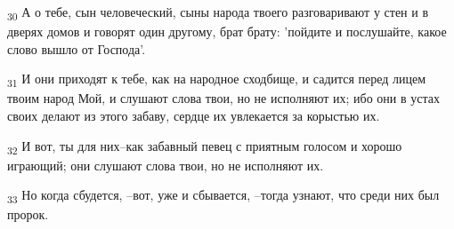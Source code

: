 \begin{tcolorbox}
\textsubscript{30} А о тебе, сын человеческий, сыны народа твоего разговаривают у стен и в дверях домов и говорят один другому, брат брату: 'пойдите и послушайте, какое слово вышло от Господа'.
\end{tcolorbox}
\begin{tcolorbox}
\textsubscript{31} И они приходят к тебе, как на народное сходбище, и садится перед лицем твоим народ Мой, и слушают слова твои, но не исполняют их; ибо они в устах своих делают из этого забаву, сердце их увлекается за корыстью их.
\end{tcolorbox}
\begin{tcolorbox}
\textsubscript{32} И вот, ты для них--как забавный певец с приятным голосом и хорошо играющий; они слушают слова твои, но не исполняют их.
\end{tcolorbox}
\begin{tcolorbox}
\textsubscript{33} Но когда сбудется, --вот, уже и сбывается, --тогда узнают, что среди них был пророк.
\end{tcolorbox}
